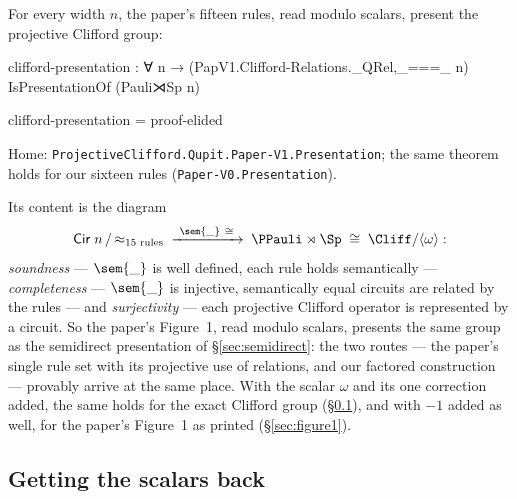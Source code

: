 \begin{theorem}\label{thm:main}
For every width $n$, the paper's fifteen rules, read modulo scalars,
present the projective Clifford group:
\begin{code}
clifford-presentation : ∀ n → (PapV1.Clifford-Relations._QRel,_===_ n) IsPresentationOf (Pauli⋊Sp n)
\end{code}
\begin{code}[hide]
clifford-presentation = proof-elided
\end{code}
\noindent Home: \texttt{ProjectiveClifford.Qupit.Paper-V1.Presentation};
the same theorem holds for our sixteen rules
(\texttt{Paper-V0.Presentation}).
\end{theorem}

\noindent Its content is the diagram
\[
  \mathsf{Cir}\;n \,/\, {\approx_{\text{15 rules}}}
  \;\xrightarrow{\ \sem{\_}\ \cong\ }\;
  \PPauli \rtimes \Sp \;\cong\; \Cliff/\langle\omega\rangle :
\]
\emph{soundness} --- $\sem{\_}$ is well defined, each rule holds
semantically --- \emph{completeness} --- $\sem{\_}$ is injective,
semantically equal circuits are related by the rules --- and
\emph{surjectivity} --- each projective Clifford operator is
represented by a circuit.  So the paper's
Figure~1, read modulo scalars, presents the same group as the
semidirect presentation of \S\ref{sec:semidirect}: the two routes ---
the paper's single rule set with its projective use of relations, and
our factored construction --- provably arrive at the same place.  With
the scalar $\omega$ and its one correction added, the same holds for
the exact Clifford group (\S\ref{sec:scalars}), and with $-1$ added as
well, for the paper's Figure~1 as printed (\S\ref{sec:figure1}).

\subsection{Getting the scalars back}\label{sec:scalars}

